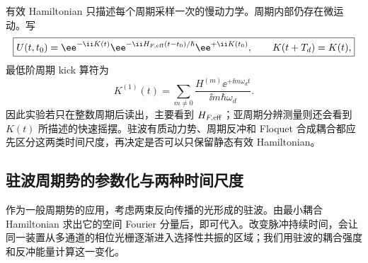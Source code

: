 有效 Hamiltonian 只描述每个周期采样一次的慢动力学。周期内部仍存在微运动。写
\begin{equation}
\boxed{
U(t,t_0)
=\ee^{-\ii K(t)}
\ee^{-\ii H_{F,\rm eff}(t-t_0)/\hbar}
\ee^{+\ii K(t_0)},
\qquad K(t+T_d)=K(t),}
\label{eq:floquet_micromotion_factorization}
\end{equation}
最低阶周期 kick 算符为
\begin{equation}
\boxed{
K^{(1)}(t)
=\sum_{m\neq0}
\frac{H^{(m)}\ee^{+\ii m\omega_dt}}
{\ii m\hbar\omega_d}.}
\label{eq:floquet_micromotion_kick_first_order}
\end{equation}
因此实验若只在整数周期后读出，主要看到 $H_{F,\rm eff}$；亚周期分辨测量则还会看到 $K(t)$ 所描述的快速摇摆。驻波有质动力势、周期反冲和 Floquet 合成耦合都应先区分这两类时间尺度，再决定是否可以只保留静态有效 Hamiltonian。

\subsection{驻波周期势的参数化与两种时间尺度}

作为一般周期势的应用，考虑两束反向传播的光形成的驻波。由最小耦合 Hamiltonian 求出它的空间 Fourier 分量后，即可代入。改变脉冲持续时间，会让同一装置从多通道的相位光栅逐渐进入选择性共振的区域；我们用驻波的耦合强度和反冲能量计算这一变化。

